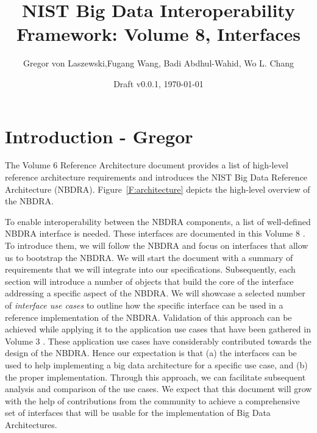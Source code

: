 \documentclass[10pt]{article}
\title{NIST Big Data Interoperability Framework: Volume 8, Interfaces}
\author{Gregor von Laszewski,Fugang Wang, Badi Abdhul-Wahid, 
        Wo L. Chang}
\date{Draft v0.0.1, \today}
\begin{document}
%





%
%


\newpage





\newpage


\newpage

\newpage



\flushbottom %
\newpage

\linenumbers



\section{Introduction - Gregor}


The Volume 6 Reference Architecture document \cite{nist-vol-6}
provides a list of high-level reference architecture requirements and
introduces the NIST Big Data Reference Architecture (NBDRA).
Figure~\ref{F:architecture} depicts the high-level overview of the
NBDRA.

To enable interoperability between the NBDRA components, a list of
well-defined NBDRA interface is needed. These interfaces are
documented in this Volume 8 \cite{nist-vol-8}. To introduce them, we
will follow the NBDRA and focus on interfaces that allow us to
bootstrap the NBDRA. We will start the document with a summary of
requirements that we will integrate into our specifications.
Subsequently, each section will introduce a number of objects that
build the core of the interface addressing a specific aspect of the
NBDRA. We will showcase a selected number of {\it interface use cases}
to outline how the specific interface can be used in a reference
implementation of the NBDRA. Validation of this approach can be
achieved while applying it to the application use cases that have been
gathered in Volume 3 \cite{nist-vol-3}. These application use cases
have considerably contributed towards the design of the NBDRA. Hence
our expectation is that (a) the interfaces can be used to help
implementing a big data architecture for a specific use case, and (b)
the proper implementation. Through this approach, we can facilitate
subsequent analysis and comparison of the use cases. We expect that
this document will grow with the help of contributions from the
community to achieve a comprehensive set of interfaces that will be
usable for the implementation of Big Data Architectures.
\end{document}
